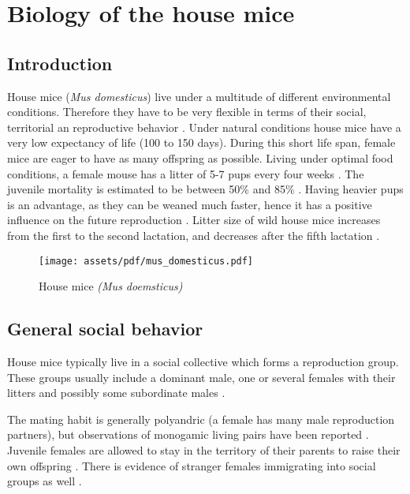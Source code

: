 \newpage
\section{Biology of the house mice}
\label{sec:biolhousemice}

\subsection{Introduction}
\label{subsec:introduction}

House mice (\textit{Mus domesticus}) live under a multitude of different environmental conditions. Therefore they have to be very flexible in terms of their social, territorial an reproductive behavior \cite{bronson:79, bronson:84, berry:81}. Under natural conditions house mice have a very low expectancy of life (100 to 150 days). During this short life span, female mice are eager to have as many offspring as possible. Living under optimal food conditions, a female mouse has a litter of 5-7 pups every four weeks \cite{berry:71, pelikan:81}. The juvenile mortality is estimated to be between 50\% and 85\% \cite{berry:71, berry:75, pennycuik:86}. Having heavier pups is an advantage, as they can be weaned much faster, hence it has a positive influence on the future reproduction \cite{fuchs:82}. Litter size of wild house mice increases from the first to the second lactation, and decreases after the fifth lactation \cite{pelikan:81, koenig:87b}. 

\begin{figure}[htbp]	
\centering	
\texttt{[image: assets/pdf/mus\_domesticus.pdf]}	
\caption[House mice]{House mice \textit{(Mus doemsticus)}}
\label{fig:housemice}
\end{figure}

\subsection{General social behavior}
\label{subsec:socialbehaviour}
House mice typically live in a social collective which forms a reproduction group. These groups usually include a dominant male, one or several females with their litters and possibly some subordinate males \cite{crowcroft:63, reimer:67, selander:70, mackintosh:81}.

The mating habit is generally polyandric (a female has many male reproduction partners), but observations of monogamic living pairs have been reported \cite{lidicker:76}. Juvenile females are allowed to stay in the territory of their parents to raise their own offspring \cite{petras:67}. There is evidence of stranger females immigrating into social groups as well \cite{anderson:65, reimer:67, selander:70, bronson:79, baker:81}.     

